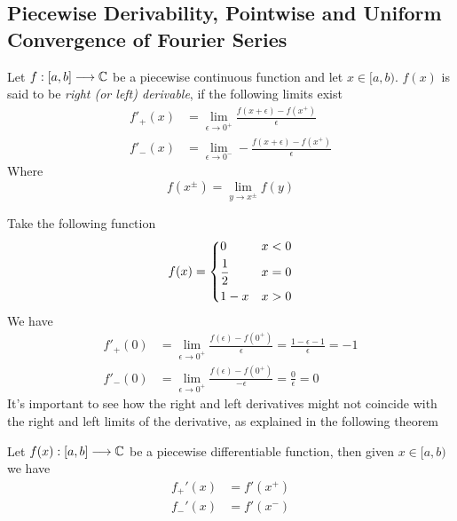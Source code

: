 \documentclass[../complete.tex]{subfiles}
\begin{document}
\subsection{Piecewise Derivability, Pointwise and Uniform Convergence of Fourier Series}
\begin{dfn}
	Let $f:[a,b]\overset{}{\longrightarrow}\mathbb{C}$ be a piecewise continuous function and let $x\in[a,b)$. $f(x)$ is said to be \textit{right (or left) derivable}, if the following limits exist
	\begin{equation*}
		\begin{aligned}
			f'_+(x)&=\lim_{\epsilon\to0^+}\frac{f(x+\epsilon)-f(x^+)}{\epsilon}\\
			f'_-(x)&=\lim_{\epsilon\to0^-}-\frac{f(x+\epsilon)-f(x^+)}{\epsilon}
		\end{aligned}
	\end{equation*}
	Where
	\begin{equation*}
		f(x^\pm)=\lim_{y\to x^{\pm}}f(y)
	\end{equation*}
\end{dfn}
\begin{eg}
	Take the following function
	\begin{equation*}
		f(x)=\begin{dcases}0&x<0\\\frac{1}{2}&x=0\\1-x&x>0\end{dcases}
	\end{equation*}
	We have
	\begin{equation*}
		\begin{aligned}
			f'_+(0)&=\lim_{\epsilon\to0^+}\frac{f(\epsilon)-f(0^+)}{\epsilon}=\frac{1-\epsilon-1}{\epsilon}=-1\\
			f'_{-}(0)&=\lim_{\epsilon\to0^+}\frac{f(\epsilon)-f(0^+)}{-\epsilon}=\frac{0}{\epsilon}=0
		\end{aligned}
	\end{equation*}
	It's important to see how the right and left derivatives might not coincide with the right and left limits of the derivative, as explained in the following theorem
\end{eg}
\begin{thm}
	Let $f(x):[a,b]\overset{}{\longrightarrow}\mathbb{C}$ be a piecewise differentiable function, then given $x\in[a,b)$ we have
	\begin{equation*}
		\begin{aligned}
			f_+'(x)&= f'(x^+)\\
			f_-'(x)&= f'(x^-)
		\end{aligned}
	\end{equation*}
\end{thm}
\end{document}
